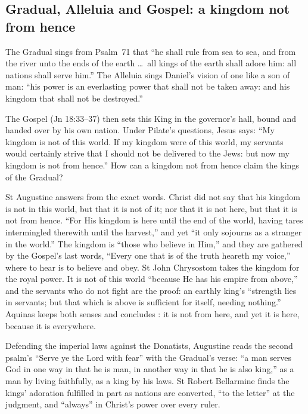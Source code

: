 \subsection{Gradual, Alleluia and Gospel: a kingdom not from hence}

The Gradual sings from Psalm~71 that ``he shall rule from sea to sea, and from
the river unto the ends of the earth \dots\ all kings of the earth shall adore
him: all nations shall serve him.'' The Alleluia sings Daniel's vision of one
like a son of man: ``his power is an everlasting power that shall not be taken
away: and his kingdom that shall not be destroyed.''

The Gospel (Jn 18:33--37) then sets this King in the governor's hall, bound
and handed over by his own nation. Under Pilate's questions, Jesus says: ``My kingdom is not of this world. If my kingdom were of this
world, my servants would certainly strive that I should not be delivered to
the Jews: but now my kingdom is not from hence.'' How can a kingdom not from
hence claim the kings of the Gradual?

St Augustine answers from the exact words. Christ did not say that his
kingdom is not in this world, but that it is not of it; nor that it is not
here, but that it is not from hence. ``For His kingdom is here until the end
of the world, having tares intermingled therewith until the harvest,'' and
yet ``it only sojourns as a stranger in the world.'' The kingdom is ``those
who believe in Him,'' and they are gathered by the Gospel's last words,
``Every one that is of the truth heareth my voice,'' where to hear is to
believe and obey. St John Chrysostom takes the kingdom for the royal power. It
is not of this world ``because He has his empire from above,'' and the
servants who do not fight are the proof: an earthly king's ``strength lies in
servants; but that which is above is sufficient for itself, needing
nothing.'' Aquinas keeps both senses and concludes : it is not from here, and yet it is here,
because it is everywhere.

Defending the imperial laws against the Donatists, Augustine reads the second
psalm's ``Serve ye the Lord with fear'' with the Gradual's verse: ``a man
serves God in one way in that he is man, in another way in that he is also
king,'' as a man by living faithfully, as a king by his laws. St Robert Bellarmine
finds the kings' adoration fulfilled in part as nations are converted, ``to
the letter'' at the judgment, and ``always'' in Christ's power over every
ruler.


